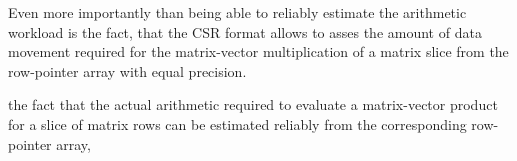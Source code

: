       Even more importantly than being able to reliably estimate the arithmetic workload is the fact, that the CSR
      format allows to asses the amount of data movement required for the matrix-vector multiplication of a matrix slice
      from the row-pointer array with equal precision.

      the fact that the actual arithmetic required to evaluate a matrix-vector product for a
      slice of matrix rows can be estimated reliably from the corresponding row-pointer array,


